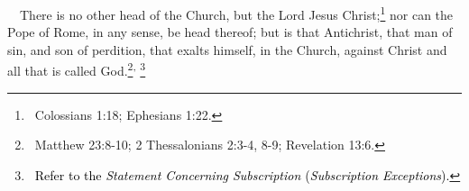 {{{{{{{{{{{{\ \ There is no other head of the Church, but the Lord Jesus Christ;\footnote{\ Colossians 1:18; Ephesians 1:22.} nor can the Pope of Rome, in any sense, be head thereof; but is that Antichrist, that man of sin, and son of perdition, that exalts himself, in the Church, against Christ and all that is called God.\footnote{\ Matthew 23:8-10; 2 Thessalonians 2:3-4, 8-9; Revelation 13:6.}\textsuperscript{,} \footnote{\ \textcolor{black}{Refer to the }\textit{\textcolor{black}{Statement Concerning Subscription }}\textcolor{black}{(}\textit{\textcolor{black}{Subscription Exceptions}}\textcolor{black}{).}}  

}}}}}}}}}}}}

